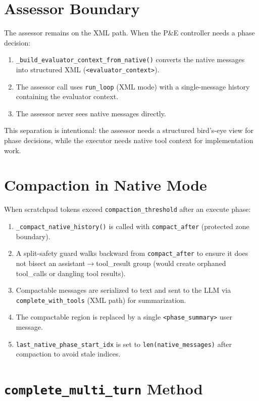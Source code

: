 \documentclass[11pt,letterpaper]{report}
\newcommand{\code}[1]{\texttt{#1}}
\begin{document}
\section{Assessor Boundary}

The assessor remains on the XML path. When the P\&E controller needs a
phase decision:
\begin{enumerate}
  \item \code{\_build\_evaluator\_context\_from\_native()} converts the
    native messages into structured XML (\code{<evaluator\_context>}).
  \item The assessor call uses \code{run\_loop} (XML mode) with a
    single-message history containing the evaluator context.
  \item The assessor never sees native messages directly.
\end{enumerate}

This separation is intentional: the assessor needs a structured bird's-eye
view for phase decisions, while the executor needs native tool context for
implementation work.

\section{Compaction in Native Mode}

When scratchpad tokens exceed \code{compaction\_threshold} after an execute
phase:
\begin{enumerate}
  \item \code{\_compact\_native\_history()} is called with
    \code{compact\_after} (protected zone boundary).
  \item A split-safety guard walks backward from \code{compact\_after} to
    ensure it does not bisect an assistant$\to$tool\_result group (would
    create orphaned tool\_calls or dangling tool results).
  \item Compactable messages are serialized to text and sent to the LLM
    via \code{complete\_with\_tools} (XML path) for summarization.
  \item The compactable region is replaced by a single
    \code{<phase\_summary>} user message.
  \item \code{last\_native\_phase\_start\_idx} is set to
    \code{len(native\_messages)} after compaction to avoid stale indices.
\end{enumerate}

\section{\code{complete\_multi\_turn} Method}
\end{document}
